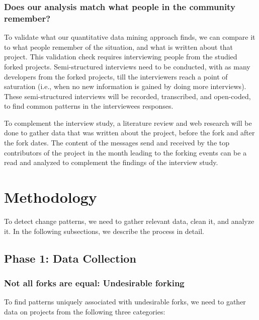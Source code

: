 \documentclass{acm_proc_article-sp}
\begin{document}

\subsubsection{Does our analysis match what people in the community remember?\\} 

To validate what our quantitative data mining approach finds, we can compare it to what people remember of the situation, and what is written about that project. This validation check requires interviewing people from the studied forked projects. Semi-structured interviews need to be conducted, with as many developers from the forked projects, till the interviewers reach a point of saturation (i.e., when no new information is gained by doing more interviews). These semi-structured interviews will be recorded, transcribed, and open-coded, to find common patterns in the interviewees responses.

To complement the interview study, a literature review and web research will be done to gather data that was written about the project, before the fork and after the fork dates. The content of the messages send and received by the top contributors of the project in the month leading to the forking events can be a read and analyzed to complement the findings of the interview study. 

\section{Methodology}
\label{methodology}

To detect change patterns, we need to gather  relevant data, clean it, and analyze it. In the following subsections, we describe the process in detail. 

\subsection{Phase 1: Data Collection}

\subsubsection{Not all forks are equal: Undesirable forking}
To find patterns uniquely associated with undesirable forks, we need to gather data on projects from the following three categories: 
\end{document}
